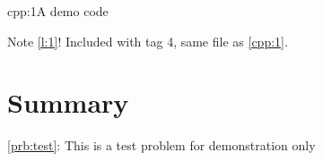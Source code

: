 \documentclass[12pt]{report}
\begin{document}
\begin{samcode}[C++ code]{cpp:1}{A demo code}
\end{samcode}

Note \cref{l:1}! Included with tag 4, same file as \cref{cpp:1}.


\chapter{Summary}

\cref{prb:test}: This is a test problem for demonstration only


 

\end{document}
